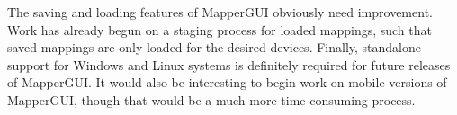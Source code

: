 The saving and loading features of MapperGUI obviously need improvement. Work has already begun on a staging process for loaded mappings, such that saved mappings are only loaded for the desired devices. Finally, standalone support for Windows and Linux systems is definitely required for future releases of MapperGUI. It would also be interesting to begin work on mobile versions of MapperGUI, though that would be a much more time-consuming process. 



	